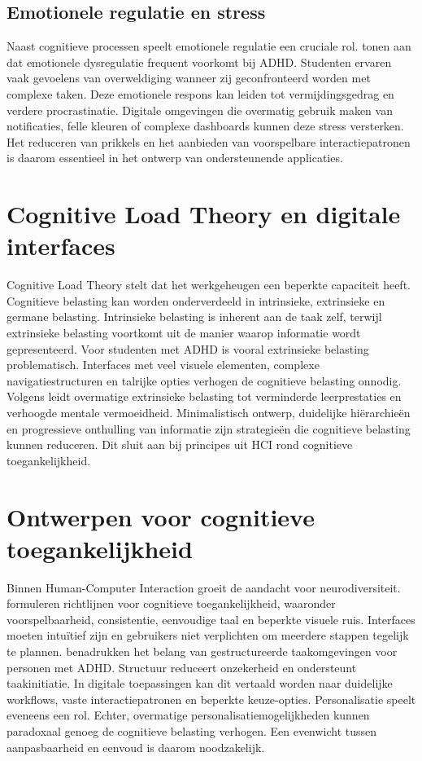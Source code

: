 \subsection{Emotionele regulatie en stress}
Naast cognitieve processen speelt emotionele regulatie een cruciale rol. \textcite{Shaw2014} tonen aan dat emotionele dysregulatie frequent voorkomt bij ADHD. Studenten ervaren vaak gevoelens van overweldiging wanneer zij geconfronteerd worden met complexe taken. Deze emotionele respons kan leiden tot vermijdingsgedrag en verdere procrastinatie. Digitale omgevingen die overmatig gebruik maken van notificaties, felle kleuren of complexe dashboards kunnen deze stress versterken. Het reduceren van prikkels en het aanbieden van voorspelbare interactiepatronen is daarom essentieel in het ontwerp van ondersteunende applicaties.

\section{Cognitive Load Theory en digitale interfaces}
Cognitive Load Theory \autocite{Sweller1988} stelt dat het werkgeheugen een beperkte capaciteit heeft. Cognitieve belasting kan worden onderverdeeld in intrinsieke, extrinsieke en germane belasting. Intrinsieke belasting is inherent aan de taak zelf, terwijl extrinsieke belasting voortkomt uit de manier waarop informatie wordt gepresenteerd. Voor studenten met ADHD is vooral extrinsieke belasting problematisch. Interfaces met veel visuele elementen, complexe navigatiestructuren en talrijke opties verhogen de cognitieve belasting onnodig. Volgens \textcite{Paas2020} leidt overmatige extrinsieke belasting tot verminderde leerprestaties en verhoogde mentale vermoeidheid. Minimalistisch ontwerp, duidelijke hiërarchieën en progressieve onthulling van informatie zijn strategieën die cognitieve belasting kunnen reduceren. Dit sluit aan bij principes uit HCI rond cognitieve toegankelijkheid.



\section{Ontwerpen voor cognitieve toegankelijkheid}
Binnen Human-Computer Interaction groeit de aandacht voor neurodiversiteit. \textcite{Seeman2022} formuleren richtlijnen voor cognitieve toegankelijkheid, waaronder voorspelbaarheid, consistentie, eenvoudige taal en beperkte visuele ruis. Interfaces moeten intuïtief zijn en gebruikers niet verplichten om meerdere stappen tegelijk te plannen. \textcite{Visser2016} benadrukken het belang van gestructureerde taakomgevingen voor personen met ADHD. Structuur reduceert onzekerheid en ondersteunt taakinitiatie. In digitale toepassingen kan dit vertaald worden naar duidelijke workflows, vaste interactiepatronen en beperkte keuze-opties. Personalisatie speelt eveneens een rol. Echter, overmatige personalisatiemogelijkheden kunnen paradoxaal genoeg de cognitieve belasting verhogen. Een evenwicht tussen aanpasbaarheid en eenvoud is daarom noodzakelijk.

